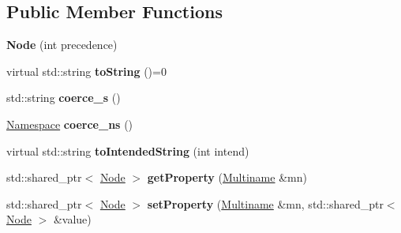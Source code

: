 \subsection*{Public Member Functions}
\begin{DoxyCompactItemize}
\item 
\hypertarget{classjswf_1_1avm2_1_1ast_1_1_node_a46fe59a6cc17db632f9ba30822fb3aa8}{{\bfseries Node} (int precedence)}\label{classjswf_1_1avm2_1_1ast_1_1_node_a46fe59a6cc17db632f9ba30822fb3aa8}

\item 
\hypertarget{classjswf_1_1avm2_1_1ast_1_1_node_a51999c6e386f245932a10c1113bcc1da}{virtual std\+::string {\bfseries to\+String} ()=0}\label{classjswf_1_1avm2_1_1ast_1_1_node_a51999c6e386f245932a10c1113bcc1da}

\item 
\hypertarget{classjswf_1_1avm2_1_1ast_1_1_node_accc224a86b8763b8118eada587a8d3f0}{std\+::string {\bfseries coerce\+\_\+s} ()}\label{classjswf_1_1avm2_1_1ast_1_1_node_accc224a86b8763b8118eada587a8d3f0}

\item 
\hypertarget{classjswf_1_1avm2_1_1ast_1_1_node_ab9b58f5ac7724aea72c7cfe915e26160}{\hyperlink{structjswf_1_1avm2_1_1_namespace}{Namespace} {\bfseries coerce\+\_\+ns} ()}\label{classjswf_1_1avm2_1_1ast_1_1_node_ab9b58f5ac7724aea72c7cfe915e26160}

\item 
\hypertarget{classjswf_1_1avm2_1_1ast_1_1_node_a7b5a29af1daaa743edb692f2cc1c5406}{virtual std\+::string {\bfseries to\+Intended\+String} (int intend)}\label{classjswf_1_1avm2_1_1ast_1_1_node_a7b5a29af1daaa743edb692f2cc1c5406}

\item 
\hypertarget{classjswf_1_1avm2_1_1ast_1_1_node_a448c422f0c108a0b2a76b03b991421e9}{std\+::shared\+\_\+ptr$<$ \hyperlink{classjswf_1_1avm2_1_1ast_1_1_node}{Node} $>$ {\bfseries get\+Property} (\hyperlink{structjswf_1_1avm2_1_1_multiname}{Multiname} \&mn)}\label{classjswf_1_1avm2_1_1ast_1_1_node_a448c422f0c108a0b2a76b03b991421e9}

\item 
\hypertarget{classjswf_1_1avm2_1_1ast_1_1_node_a5df00f84b7f6416cbe892c3fd4144c5d}{std\+::shared\+\_\+ptr$<$ \hyperlink{classjswf_1_1avm2_1_1ast_1_1_node}{Node} $>$ {\bfseries set\+Property} (\hyperlink{structjswf_1_1avm2_1_1_multiname}{Multiname} \&mn, std\+::shared\+\_\+ptr$<$ \hyperlink{classjswf_1_1avm2_1_1ast_1_1_node}{Node} $>$ \&value)}\label{classjswf_1_1avm2_1_1ast_1_1_node_a5df00f84b7f6416cbe892c3fd4144c5d}

\end{DoxyCompactItemize}
